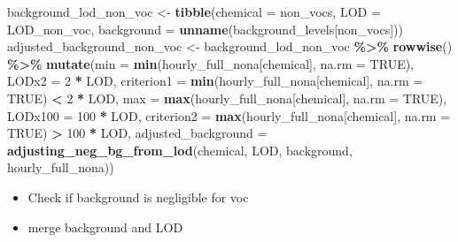 \documentclass[
]{article}
\newenvironment{Shaded}{\begin{snugshade}}{\end{snugshade}}
\newcommand{\AttributeTok}[1]{\textcolor[rgb]{0.13,0.29,0.53}{#1}}
\newcommand{\ConstantTok}[1]{\textcolor[rgb]{0.56,0.35,0.01}{#1}}
\newcommand{\DecValTok}[1]{\textcolor[rgb]{0.00,0.00,0.81}{#1}}
\newcommand{\FunctionTok}[1]{\textcolor[rgb]{0.13,0.29,0.53}{\textbf{#1}}}
\newcommand{\NormalTok}[1]{#1}
\newcommand{\OtherTok}[1]{\textcolor[rgb]{0.56,0.35,0.01}{#1}}
\newcommand{\SpecialCharTok}[1]{\textcolor[rgb]{0.81,0.36,0.00}{\textbf{#1}}}
\providecommand{\tightlist}{%
  \setlength{\itemsep}{0pt}\setlength{\parskip}{0pt}}
\begin{document}
\begin{Shaded}
\begin{Highlighting}[]
\NormalTok{background\_lod\_non\_voc }\OtherTok{\textless{}{-}} \FunctionTok{tibble}\NormalTok{(}\AttributeTok{chemical =}\NormalTok{ non\_vocs,}
                                 \AttributeTok{LOD =}\NormalTok{ LOD\_non\_voc,}
                                 \AttributeTok{background =} \FunctionTok{unname}\NormalTok{(background\_levels[non\_vocs]))}
\NormalTok{adjusted\_background\_non\_voc }\OtherTok{\textless{}{-}}\NormalTok{ background\_lod\_non\_voc }\SpecialCharTok{\%\textgreater{}\%}
  \FunctionTok{rowwise}\NormalTok{() }\SpecialCharTok{\%\textgreater{}\%}
  \FunctionTok{mutate}\NormalTok{(}\AttributeTok{min =} \FunctionTok{min}\NormalTok{(hourly\_full\_nona[chemical], }\AttributeTok{na.rm =} \ConstantTok{TRUE}\NormalTok{),}
         \AttributeTok{LODx2 =} \DecValTok{2} \SpecialCharTok{*}\NormalTok{ LOD,}
         \AttributeTok{criterion1 =} \FunctionTok{min}\NormalTok{(hourly\_full\_nona[chemical], }\AttributeTok{na.rm =} \ConstantTok{TRUE}\NormalTok{) }\SpecialCharTok{\textless{}} \DecValTok{2} \SpecialCharTok{*}\NormalTok{ LOD,}
         \AttributeTok{max =} \FunctionTok{max}\NormalTok{(hourly\_full\_nona[chemical], }\AttributeTok{na.rm =} \ConstantTok{TRUE}\NormalTok{),}
         \AttributeTok{LODx100 =} \DecValTok{100} \SpecialCharTok{*}\NormalTok{ LOD,}
         \AttributeTok{criterion2 =} \FunctionTok{max}\NormalTok{(hourly\_full\_nona[chemical], }\AttributeTok{na.rm =} \ConstantTok{TRUE}\NormalTok{) }\SpecialCharTok{\textgreater{}} \DecValTok{100} \SpecialCharTok{*}\NormalTok{ LOD,}
         \AttributeTok{adjusted\_background =} \FunctionTok{adjusting\_neg\_bg\_from\_lod}\NormalTok{(chemical, LOD, background, }
\NormalTok{                                                         hourly\_full\_nona))}
\end{Highlighting}
\end{Shaded}

\begin{itemize}
\tightlist
\item
  Check if background is negligible for voc
\item
  merge background and LOD
\end{itemize}
\end{document}

